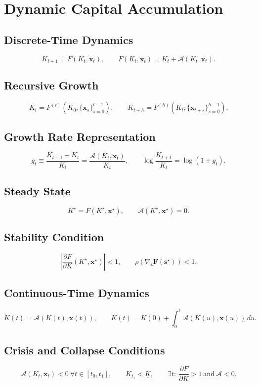 \documentclass[11pt]{article}
\begin{document}
\section{Dynamic Capital Accumulation}

\subsection{Discrete-Time Dynamics}
\[
K_{t+1}=F(K_t,\bm{x}_t),
\qquad F(K_t,\bm{x}_t)=K_t+\mathcal{A}(K_t,\bm{x}_t).
\]

\subsection{Recursive Growth}
\[
K_t=F^{(t)}(K_0;\{\bm{x}_s\}_{s=0}^{t-1}),
\qquad K_{t+h}=F^{(h)}(K_t;\{\bm{x}_{t+s}\}_{s=0}^{h-1}).
\]

\subsection{Growth Rate Representation}
\[
g_t\equiv\frac{K_{t+1}-K_t}{K_t}=\frac{\mathcal{A}(K_t,\bm{x}_t)}{K_t},
\qquad \log\frac{K_{t+1}}{K_t}=\log(1+g_t).
\]

\subsection{Steady State}
\[
K^{\star}=F(K^{\star},\bm{x}^{\star}),
\qquad \mathcal{A}(K^{\star},\bm{x}^{\star})=0.
\]

\subsection{Stability Condition}
\[
\left|\frac{\partial F}{\partial K}(K^{\star},\bm{x}^{\star})\right|<1,
\qquad \rho\!\left(\nabla_{\bm{s}}\bm{F}(\bm{s}^{\star})\right)<1.
\]

\subsection{Continuous-Time Dynamics}
\[
\dot K(t)=\mathcal{A}(K(t),\bm{x}(t)),
\qquad K(t)=K(0)+\int_0^t\mathcal{A}(K(u),\bm{x}(u))\,du.
\]

\subsection{Crisis and Collapse Conditions}
\[
\mathcal{A}(K_t,\bm{x}_t)<0\ \forall t\in[t_0,t_1],
\qquad K_{t_1}<\underline{K},
\qquad \exists t:\ \frac{\partial F}{\partial K}>1\ \text{and}\ \mathcal{A}<0.
\]
\end{document}
